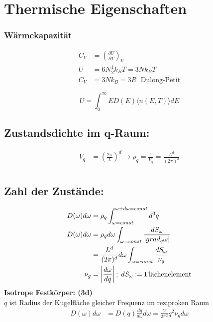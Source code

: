 \section{Thermische Eigenschaften}

\subsubsection*{Wärmekapazität}

\begin{equation*}
    \begin{aligned}
        C_V &= \left(\frac{\partial U}{\partial T}\right)_V \\
        U &= 6N \frac{1}{2} k_B T = 3 N k_B T \\
        C_V &= 3Nk_B = 3R \; \text{ Dulong-Petit}
    \end{aligned}
\end{equation*}

\begin{equation*}
    U = \int_0^\infty E D(E) \langle n(E,T) \rangle dE
\end{equation*}

\subsection*{Zustandsdichte im q-Raum:}
\begin{equation*}
    \begin{aligned}
        V_q &= \left(\frac{2 \pi}{L}\right)^d \rightarrow \rho_q = \frac{1}{V_q} = \frac{L^d}{(2\pi)^d} \\
    \end{aligned}
\end{equation*}
\subsection*{Zahl der Zustände:}
\begin{equation*}
    \begin{aligned}
        D(\omega)d\omega &= \rho_q \int_{\omega = const}^{\omega + d\omega = const} d^3q\\
        D(\omega) d\omega &= \rho_q d\omega \int_{\omega=const} \frac{dS_\omega}{\left\vert grad_q \omega\right\vert} \\
        &= \frac{L^d}{(2\pi)^d} d\omega \int_{\omega = const} \frac{dS_\omega}{\nu_g} \\
        \nu_g &= \left\vert\frac{d\omega}{dq}\right\vert; \; dS_\omega := \text{Flächenelement}
    \end{aligned}
\end{equation*}
\textbf{Isotrope Festkörper: (3d)}\\
$q$ ist Radius der Kugelfläche gleicher Frequenz im reziproken Raum
\begin{equation*}
    \begin{aligned}
        D(\omega) d\omega &= D(q) \frac{dq}{d\omega} d\omega = \frac{V}{2 \pi^2} q^2 \nu_g d\omega
    \end{aligned}
\end{equation*}

